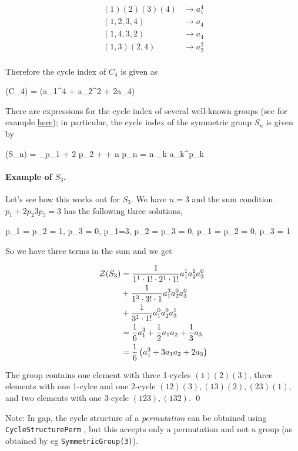\begin{align*}
  (1)(2)(3)(4) &\rightarrow a_1^4 \\
  (1,2,3,4)  &\rightarrow a_4 \\
  (1,4,3,2)  &\rightarrow a_4 \\
  (1,3)(2,4) &\rightarrow a_2^2 \\
\end{align*}

Therefore the cycle index of $C_4$ is given as

\bee
\Zc(C_4) =  (a_1^4 + a_2^2 + 2a_4)
\eee

There are expressions for the cycle index of several well-known groups (see for example \href{https://en.wikipedia.org/wiki/Cycle_index}{here}); in particular, the cycle index of the symmetric group $S_n$ is given by

\bee
\Zc(S_n) = \sum_{p_1 + 2 p_2 + \cdots + n p_n = n}  \prod_k a_k^{p_k}
\eee

\paragraph{Example of $S_3$.} Let's see how this works out for $S_3$. We have $n=3$ and the sum condition $p_1 + 2 p_2 3 p_3 = 3$ has the following three solutions,

\bee
p_1 = p_2 = 1, p_3 = 0, \quad p_1=3, p_2 = p_3 = 0, \quad p_1 = p_2 = 0, p_3 = 1
\eee

So we have three terms in the sum and we get

\begin{align*}
  \mathcal{Z}(S_3) &= \frac{1}{1^1 \cdot 1! \cdot 2^1 \cdot 1!} a_1^1 a_2^1 a_3^0 \\
           &+ \frac{1}{1^3 \cdot 3! \cdot 1} a_1^3 a_2^0 a_3^0 \\
           &+ \frac{1}{3^1 \cdot 1!} a_1^0 a_2^0 a_3^1 \\
           &= \frac{1}{6} a_1^3 + \frac{1}{2} a_1 a_2 + \frac{1}{3} a_3 \\
           &= \frac{1}{6} \left(a_1^3 + 3 a_1 a_2 + 2 a_3 \right)
\end{align*}


The group contains one element with three 1-cycles $(1)(2)(3)$, three elements with one 1-cylce and one 2-cycle $(12)(3), (13)(2), (23)(1)$, and two elements with one 3-cycle $(123),(132)$. \qed

Note: In gap, the cycle structure of a \emph{permutation} can be obtained using\\ \verb+CycleStructurePerm+ , but this accepts only a permutation and not a group (as obtained by eg \verb+SymmetricGroup(3)+).


